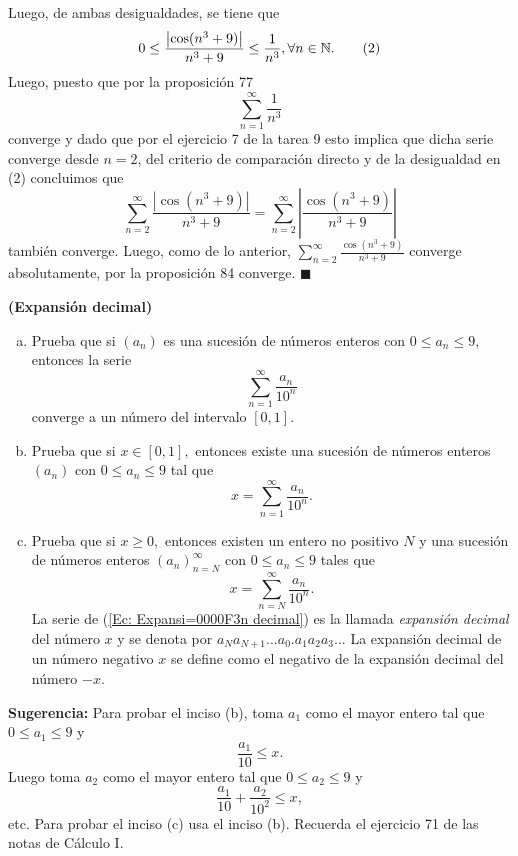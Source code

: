 \documentclass[11pt]{scrartcl}
\begin{document}
\begin{enumerate}[(a)]
    Luego, de ambas desigualdades, se tiene que
    \[
    0 \leq \frac{\left|\cos(n^3 + 9)\right|}{n^3+9} \leq \frac{1}{n^3}, \forall n \in \mathbb N. \tag{2}
    \]
    Luego, puesto que por la proposición 77
    \[
    \sum_{n=1}^{\infty}\frac{1}{n^3}
    \]
    converge y dado que por el ejercicio 7 de la tarea 9 esto implica que dicha serie converge desde $n=2$, del criterio de comparación directo y de la
    desigualdad en (2) concluimos que
    \[
    \sum_{n=2}^{\infty}\frac{\left|\cos(n^3 + 9)\right|}{n^3+9} = \sum_{n=2}^{\infty}\left|\frac{\cos(n^3 + 9)}{n^3+9}\right|
    \]
    también converge. Luego, como de lo anterior, $\sum_{n=2}^{\infty}\frac{\cos(n^3 + 9)}{n^3+9}$ converge absolutamente, por la proposición 84 converge.
    $\blacksquare$
\end{enumerate}
\begin{mdframed}[style=mdpurplebox, frametitle={Ejercicio 05, Tarea 10, Cálculo II}]
    \textbf{(Expansión decimal)} 
    \begin{enumerate}[(a)]
        \item Prueba que si $\left(a_{n}\right)$ es una sucesión de números enteros
        con $0\leq a_{n}\leq 9,$ entonces la serie 
        \[ 
        \sum_{n=1}^{\infty}\frac{a_{n}}{10^{n}}
        \]
        converge a un número del intervalo $\left[0,1\right].$ 
        \item Prueba que si $x\in\left[0,1\right],$ entonces existe una sucesión
        de números enteros $\left(a_{n}\right)$ con $0\leq a_{n}\leq9$ tal que 
        \[
        x=\sum_{n=1}^{\infty}\frac{a_{n}}{10^{n}}.
        \]
        \item Prueba que si $x\geq0,$ entonces existen un entero no positivo
        $N$ y una sucesión de números enteros $\left(a_{n}\right)_{n=N}^{\infty}$
        con $0\leq a_{n}\leq9$ tales que 
        \begin{equation}
            x=\sum_{n=N}^{\infty}\frac{a_{n}}{10^{n}}.\label{Ec: Expansi=0000F3n decimal}
        \end{equation}
        La serie de (\ref{Ec: Expansi=0000F3n decimal}) es la llamada \textit{expansión
        decimal} del número $x$ y
        se denota por $a_{N}a_{N+1}...a_{0}.a_{1}a_{2}a_{3}...$ La expansión
        decimal de un número negativo $x$ se define como el negativo de la
        expansión decimal del número $-x.$
    \end{enumerate}
    \textbf{Sugerencia:} Para probar el inciso (b), toma $a_{1}$ como
    el mayor entero tal que $0\leq a_{1}\leq 9$ y 
    \[
    \frac{a_{1}}{10}\leq x.
    \]
    Luego toma $a_{2}$ como el mayor entero tal que $0\leq a_{2}\leq9$
    y 
    \[
    \frac{a_{1}}{10}+\frac{a_{2}}{10^{2}}\leq x,
    \]
    etc. Para probar el inciso (c) usa el inciso (b). Recuerda el ejercicio
    71 de las notas de Cálculo I.    
\end{mdframed}
\end{document}
